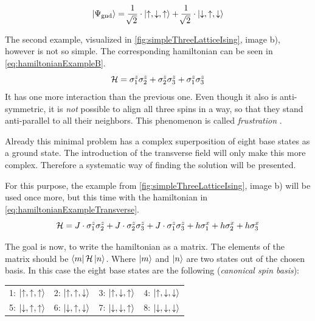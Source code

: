 \begin{equation}
    \label{eq:solutionSimpleExample}
    \ket{\Psi_\mathrm{gnd}} = \frac{1}{\sqrt[]{2}} \cdot \ket{\uparrow, \downarrow, \uparrow} +  \frac{1}{\sqrt[]{2}} \cdot \ket{\downarrow, \uparrow, \downarrow}
\end{equation}

The second example, visualized in \autoref{fig:simpleThreeLatticeIsing}, image b), however is not so simple. The corresponding hamiltonian can be seen in \autoref{eq:hamiltonianExampleB}.
\begin{equation}
    \label{eq:hamiltonianExampleB}
    \mathcal{H} = \sigma^z_1\sigma^z_2 +\sigma^z_2\sigma^z_3 +\sigma^z_1\sigma^z_3
\end{equation}
It has one more interaction than the previous one. Even though it also is anti-symmetric, it is \emph{not} possible to align all three spins in a way, so that they stand anti-parallel to all their neighbors. This phenomenon is called \emph{frustration} \cite*{frustration}.

Already this minimal problem has a complex superposition of eight base states as a ground state. The introduction of the transverse field will only make this more complex. Therefore a systematic way of finding the solution will be presented.

For this purpose, the example from \autoref{fig:simpleThreeLatticeIsing}, image b) will be used once more, but this time with the hamiltonian in \autoref{eq:hamiltonianExampleTransverse}.
\begin{equation}
    \label{eq:hamiltonianExampleTransverse}
    \mathcal{H} = J\cdot \sigma^z_1\sigma^z_2 +J\cdot\sigma^z_2\sigma^z_3 +J\cdot\sigma^z_1\sigma^z_3
    +h \sigma^x_1+h \sigma^x_2+h \sigma^x_3
\end{equation}

The goal is now, to write the hamiltonian \hamiltonian as a matrix. 
The elements of the matrix should be $\bra{m}\mathcal{H}\ket{n}$. Where $\ket{m}$ and $\ket{n}$ are two states out of the chosen basis. In this case the eight base states are the following (\emph{canonical spin basis}):

\begin{center}
    \begin{tabular}{llll} 
        1: $\ket{\uparrow, \uparrow, \uparrow}$ & 2: $\ket{\uparrow, \uparrow, \downarrow}$  & 3: $\ket{\uparrow, \downarrow, \uparrow}$  & 4: $\ket{\uparrow, \downarrow, \downarrow}$ \\
        5: $\ket{\downarrow, \uparrow, \uparrow}$ & 6: $\ket{\downarrow, \uparrow, \downarrow}$  & 7: $\ket{\downarrow, \downarrow, \uparrow}$  & 8: $\ket{\downarrow, \downarrow, \downarrow}$ 
    \end{tabular}
\end{center}

